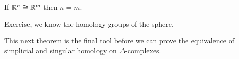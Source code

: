 \documentclass[a4paper]{article}
\begin{document}
\begin{thrm}
    If $\mathbb{R}^n\cong\mathbb{R}^m$ then $n=m$.
    \begin{prf}
        Exercise, we know the homology groups of the sphere.
    \end{prf}
\end{thrm}
This next theorem is the final tool before we can prove the equivalence of simplicial and singular homology on $\Delta$-complexes.
\begin{thrm}
    
\end{thrm}


\end{document}
